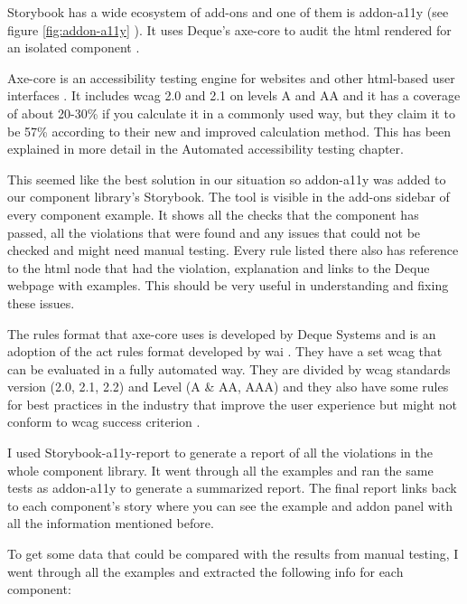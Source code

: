 \documentclass{master_thesis}
\begin{document}
Storybook has a wide ecosystem of add-ons and one of them is addon-a11y (see figure \ref{fig:addon-a11y} ). It uses Deque's axe-core to audit the \ac{html} rendered for an isolated component \citep{addon-a11y}.

Axe-core is an accessibility testing engine for websites and other \ac{html}-based user interfaces \citep{Deque2023}. It includes \ac{wcag} 2.0 and 2.1 on levels A and AA and it has a coverage of about 20-30\% if you calculate it in a commonly used way, but they claim it to be 57\% according to their new and improved calculation method. This has been explained in more detail in the Automated accessibility testing chapter.

This seemed like the best solution in our situation so addon-a11y was added to our component library’s Storybook. The tool is visible in the add-ons sidebar of every component example. It shows all the checks that the component has passed, all the violations that were found and any issues that could not be checked and might need manual testing. Every rule listed there also has reference to the \ac{html} node that had the violation, explanation and links to the Deque webpage with examples. This should be very useful in understanding and fixing these issues.

The rules format that axe-core uses is developed by Deque Systems and is an adoption of the \ac{act} rules format developed by \ac{wai} \citep{Fiers2017}. They have a set \ac{wcag} that can be evaluated in a fully automated way. They are divided by \ac{wcag} standards version (2.0, 2.1, 2.2) and Level (A \& AA, AAA) and they also have some rules for best practices in the industry that improve the user experience but might not conform to \ac{wcag} success criterion \citep{Fiers2023}.

I used Storybook-a11y-report \citep{Karube2020} to generate a report of all the violations in the whole component library. It went through all the examples and ran the same tests as addon-a11y to generate a summarized report. The final report links back to each component's story where you can see the example and addon panel with all the information mentioned before. 

To get some data that could be compared with the results from manual testing, I went through all the examples and extracted the following info for each component:
\end{document}
